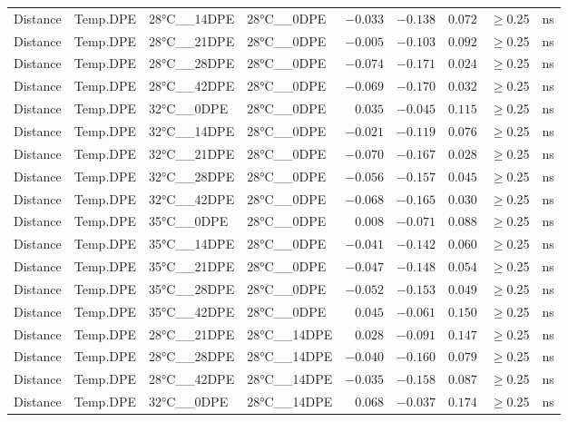 \documentclass[
]{article}
\begin{document}
\begin{longtable}{llllrrrrl}
\midrule\addlinespace[2.5pt]
\multicolumn{9}{l}{canberra} \\ 
\midrule\addlinespace[2.5pt]
Distance & Temp.DPE & 28°C\_\_14DPE & 28°C\_\_0DPE & $-0.033$ & $-0.138$ & $0.072$ & $\geq$0.25 & ns \\ 
Distance & Temp.DPE & 28°C\_\_21DPE & 28°C\_\_0DPE & $-0.005$ & $-0.103$ & $0.092$ & $\geq$0.25 & ns \\ 
Distance & Temp.DPE & 28°C\_\_28DPE & 28°C\_\_0DPE & $-0.074$ & $-0.171$ & $0.024$ & $\geq$0.25 & ns \\ 
Distance & Temp.DPE & 28°C\_\_42DPE & 28°C\_\_0DPE & $-0.069$ & $-0.170$ & $0.032$ & $\geq$0.25 & ns \\ 
Distance & Temp.DPE & 32°C\_\_0DPE & 28°C\_\_0DPE & $0.035$ & $-0.045$ & $0.115$ & $\geq$0.25 & ns \\ 
Distance & Temp.DPE & 32°C\_\_14DPE & 28°C\_\_0DPE & $-0.021$ & $-0.119$ & $0.076$ & $\geq$0.25 & ns \\ 
Distance & Temp.DPE & 32°C\_\_21DPE & 28°C\_\_0DPE & $-0.070$ & $-0.167$ & $0.028$ & $\geq$0.25 & ns \\ 
Distance & Temp.DPE & 32°C\_\_28DPE & 28°C\_\_0DPE & $-0.056$ & $-0.157$ & $0.045$ & $\geq$0.25 & ns \\ 
Distance & Temp.DPE & 32°C\_\_42DPE & 28°C\_\_0DPE & $-0.068$ & $-0.165$ & $0.030$ & $\geq$0.25 & ns \\ 
Distance & Temp.DPE & 35°C\_\_0DPE & 28°C\_\_0DPE & $0.008$ & $-0.071$ & $0.088$ & $\geq$0.25 & ns \\ 
Distance & Temp.DPE & 35°C\_\_14DPE & 28°C\_\_0DPE & $-0.041$ & $-0.142$ & $0.060$ & $\geq$0.25 & ns \\ 
Distance & Temp.DPE & 35°C\_\_21DPE & 28°C\_\_0DPE & $-0.047$ & $-0.148$ & $0.054$ & $\geq$0.25 & ns \\ 
Distance & Temp.DPE & 35°C\_\_28DPE & 28°C\_\_0DPE & $-0.052$ & $-0.153$ & $0.049$ & $\geq$0.25 & ns \\ 
Distance & Temp.DPE & 35°C\_\_42DPE & 28°C\_\_0DPE & $0.045$ & $-0.061$ & $0.150$ & $\geq$0.25 & ns \\ 
Distance & Temp.DPE & 28°C\_\_21DPE & 28°C\_\_14DPE & $0.028$ & $-0.091$ & $0.147$ & $\geq$0.25 & ns \\ 
Distance & Temp.DPE & 28°C\_\_28DPE & 28°C\_\_14DPE & $-0.040$ & $-0.160$ & $0.079$ & $\geq$0.25 & ns \\ 
Distance & Temp.DPE & 28°C\_\_42DPE & 28°C\_\_14DPE & $-0.035$ & $-0.158$ & $0.087$ & $\geq$0.25 & ns \\ 
Distance & Temp.DPE & 32°C\_\_0DPE & 28°C\_\_14DPE & $0.068$ & $-0.037$ & $0.174$ & $\geq$0.25 & ns \\ 

\end{longtable}
\end{document}
